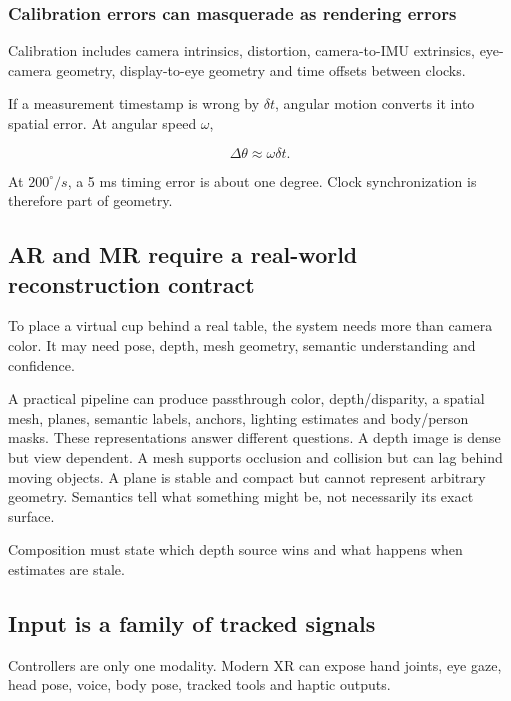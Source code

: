 \subsubsection{Calibration errors can masquerade as rendering errors}\label{04-visual-computing-ii-ch035-calibration-errors-can-masquerade-as-rendering-errors}

Calibration includes camera intrinsics, distortion, camera-to-IMU extrinsics, eye-camera geometry, display-to-eye geometry and time offsets between clocks.

If a measurement timestamp is wrong by \(\delta t\), angular motion converts it into spatial error. At angular speed \(\omega\),

\[
\Delta\theta\approx \omega\delta t.
\]

At \(200^\circ/s\), a 5 ms timing error is about one degree. Clock synchronization is therefore part of geometry.

\subsection{AR and MR require a real-world reconstruction contract}\label{04-visual-computing-ii-ch035-ar-and-mr-require-a-real-world-reconstruction-contract}

To place a virtual cup behind a real table, the system needs more than camera color. It may need pose, depth, mesh geometry, semantic understanding and confidence.

A practical pipeline can produce passthrough color, depth/disparity, a spatial mesh, planes, semantic labels, anchors, lighting estimates and body/person masks. These representations answer different questions. A depth image is dense but view dependent. A mesh supports occlusion and collision but can lag behind moving objects. A plane is stable and compact but cannot represent arbitrary geometry. Semantics tell what something might be, not necessarily its exact surface.

Composition must state which depth source wins and what happens when estimates are stale.

\subsection{Input is a family of tracked signals}\label{04-visual-computing-ii-ch035-input-is-a-family-of-tracked-signals}

Controllers are only one modality. Modern XR can expose hand joints, eye gaze, head pose, voice, body pose, tracked tools and haptic outputs.

